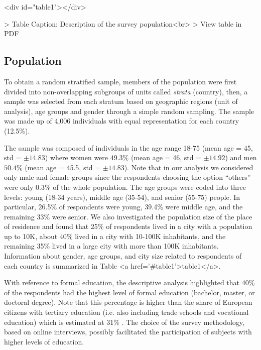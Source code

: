 \documentclass{article}
\begin{document}
\begin{table}<div id="table1"></div>

> Table Caption: Description of the survey population<br>
> View table in PDF
\end{table}


\subsection{Population}

To obtain a random stratified sample, members of the population were first divided into non-overlapping subgroups of units called \emph{strata} (country), then, a sample was selected from each stratum based on geographic regions (unit of analysis), age groups and gender through a simple random sampling. The sample was made up of 4,006 individuals with equal representation for each country (12.5\%). 

The sample was composed of individuals in the age range 18-75 (mean age = 45, std = $\pm{14.83}$) where women were $49.3\%$ (mean age = 46, std = $\pm{14.92}$) and men $50.4\%$ (mean age = 45.5, std = $\pm{14.83}$). Note that in our analysis we considered only male and female groups since the respondents choosing the option ``others'' were only 0.3\% of the whole population. The age groups were coded into three levels: young (18-34 years), middle age (35-54), and senior (55-75) people. In particular, 26.5\% of respondents were young, 39.4\% were middle age, and the remaining 33\% were senior. We also investigated the population size of the place of residence and found that 25\% of respondents lived in a city with a population up to 10K, about 40\% lived in a city with 10-100K inhabitants, and the remaining 35\% lived in a large city with more than 100K inhabitants. Information about gender, age groups, and city size related to respondents of each country is summarized in Table <a href='#table1'>table1</a>.

With reference to formal education, the descriptive analysis highlighted that 40\% of the respondents had the highest level of formal education (bachelor, master, or doctoral degree). Note that this percentage is higher than the share of European citizens with tertiary education (i.e. also including trade schools and vocational education) which is estimated at 31\% \cite{eurostat2021educational}. The choice of the survey methodology, based on online interviews, possibly facilitated the participation of subjects with higher levels of education.
\end{document}
